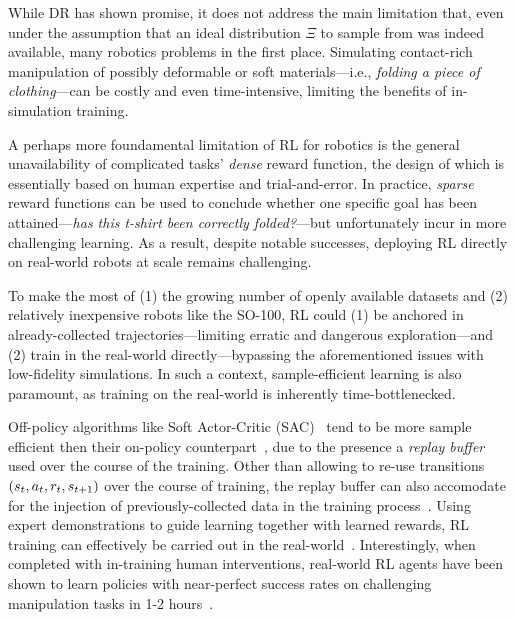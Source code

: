 While DR has shown promise, it does not address the main limitation that, even under the assumption that an ideal distribution \( \Xi \) to sample from was indeed available, many robotics problems  in the first place.
Simulating contact-rich manipulation of possibly deformable or soft materials---i.e., \emph{folding a piece of clothing}---can be costly and even time-intensive, limiting the benefits of in-simulation training.

A perhaps more foundamental limitation of RL for robotics is the general unavailability of complicated tasks' \emph{dense} reward function, the design of which is essentially based on human expertise and trial-and-error.
In practice, \emph{sparse} reward functions can be used to conclude whether one specific goal has been attained---\emph{has this t-shirt been correctly folded?}---but unfortunately incur in more challenging learning.
As a result, despite notable successes, deploying RL directly on real-world robots at scale remains challenging.

To make the most of (1) the growing number of openly available datasets and (2) relatively inexpensive robots like the SO-100, RL could (1) be anchored in already-collected trajectories---limiting erratic and dangerous exploration---and (2) train in the real-world directly---bypassing the aforementioned issues with low-fidelity simulations.
In such a context, sample-efficient learning is also paramount, as training on the real-world is inherently time-bottlenecked.

Off-policy algorithms like Soft Actor-Critic (SAC)~\citep{haarnojaSoftActorCriticOffPolicy2018} tend to be more sample efficient then their on-policy counterpart~\citep{schulmanProximalPolicyOptimization2017}, due to the presence a \emph{replay buffer} used over the course of the training.
Other than allowing to re-use transitions \( (s_t, a_t, r_t, s_{t+1}) \) over the course of training, the replay buffer can also accomodate for the injection of previously-collected data in the training process~\citep{ballEfficientOnlineReinforcement2023}.
Using expert demonstrations to guide learning together with learned rewards, RL training can effectively be carried out in the real-world~\citep{luoSERLSoftwareSuite2025}.
Interestingly, when completed with in-training human interventions, real-world RL agents have been shown to learn policies with near-perfect success rates on challenging manipulation tasks in 1-2 hours~\citep{luoPreciseDexterousRobotic2024}.

